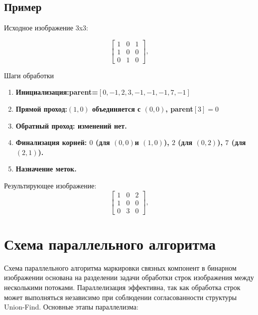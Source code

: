\documentclass[12pt]{extarticle}
\begin{document}
\subsection{Пример}

\hspace*{1.25cm}Исходное изображение 3x3:

\[
\begin{bmatrix}
1 & 0 & 1 \\
1 & 0 & 0\\
0 & 1 & 0
\end{bmatrix}, \]


Шаги обработки
\begin{enumerate}
\item \textbf{Инициализация:parent=$ [0, -1, 2, 3, -1, -1, -1, 7, -1]$}
\item \textbf{Прямой проход:$(1,0)$ объединяется с $(0,0)$, parent$[3] = 0$}
\item \textbf{Обратный проход: изменений нет.}
\item \textbf{Финализация корней: $ 0$ (для $(0,0) $и $(1,0)$), $2$ (для $(0,2)$), $7$ (для $(2,1)$).}
\item \textbf{Назначение меток.}
\end{enumerate}
Результирующее изображение:
\[
\begin{bmatrix}
1 & 0 & 2 \\
1 & 0 & 0\\
0 & 3 & 0
\end{bmatrix}, \]
\section{Схема параллельного алгоритма}

\hspace*{1.25cm}Схема параллельного алгоритма маркировки связных компонент в бинарном изображении основана на разделении задачи обработки строк изображения между несколькими потоками. Параллелизация эффективна, так как обработка строк может выполняться независимо при соблюдении согласованности структуры Union-Find. Основные этапы параллелизма:
\end{document}
